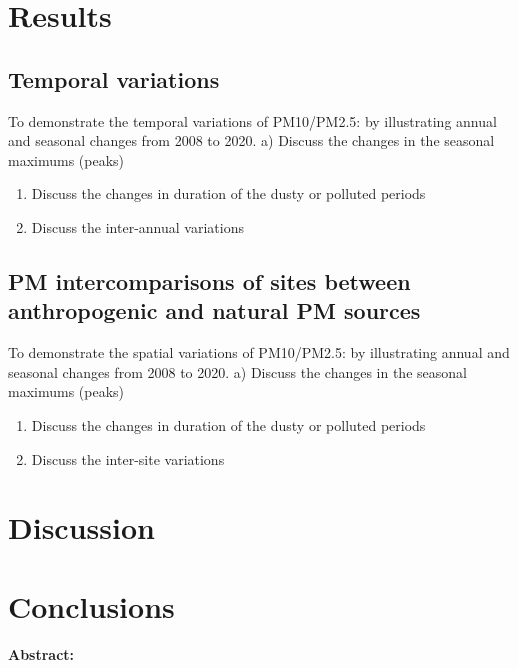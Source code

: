 \documentclass[
  number]{elsarticle}
\begin{document}
\section{Results}\label{sec-results}

\subsection{Temporal variations}\label{temporal-variations}

To demonstrate the temporal variations of PM10/PM2.5: by illustrating
annual and seasonal changes from 2008 to 2020. a) Discuss the changes in
the seasonal maximums (peaks)

\begin{enumerate}
\def\labelenumi{\alph{enumi})}
\setcounter{enumi}{1}
\item
  Discuss the changes in duration of the dusty or polluted periods
\item
  Discuss the inter-annual variations
\end{enumerate}

\subsection{PM intercomparisons of sites between anthropogenic and
natural PM
sources}\label{pm-intercomparisons-of-sites-between-anthropogenic-and-natural-pm-sources}

To demonstrate the spatial variations of PM10/PM2.5: by illustrating
annual and seasonal changes from 2008 to 2020. a) Discuss the changes in
the seasonal maximums (peaks)

\begin{enumerate}
\def\labelenumi{\alph{enumi})}
\setcounter{enumi}{1}
\item
  Discuss the changes in duration of the dusty or polluted periods
\item
  Discuss the inter-site variations
\end{enumerate}

\section{Discussion}\label{sec-discussion}

\section{Conclusions}\label{sec-conclusions}

\textbf{Abstract:}
\end{document}
